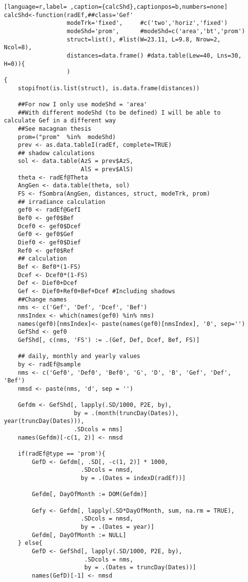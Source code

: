 \begin{lstlisting}[language=r,label= ,caption={calcShd},captionpos=b,numbers=none]
calcShd<-function(radEf,##class='Gef'
                  modeTrk='fixed',     #c('two','horiz','fixed')
                  modeShd='prom',      #modeShd=c('area','bt','prom')
                  struct=list(), #list(W=23.11, L=9.8, Nrow=2, Ncol=8), 
                  distances=data.frame() #data.table(Lew=40, Lns=30, H=0)){
                  )
{
    stopifnot(is.list(struct), is.data.frame(distances))

    ##For now I only use modeShd = 'area'
    ##With different modeShd (to be defined) I will be able to calculate Gef in a different way
    ##See macagnan thesis
    prom=("prom"  %in%  modeShd)
    prev <- as.data.tableI(radEf, complete=TRUE)
    ## shadow calculations
    sol <- data.table(AzS = prev$AzS,
                      AlS = prev$AlS)
    theta <- radEf@Theta
    AngGen <- data.table(theta, sol)
    FS <- fSombra(AngGen, distances, struct, modeTrk, prom)
    ## irradiance calculation
    gef0 <- radEf@GefI
    Bef0 <- gef0$Bef
    Dcef0 <- gef0$Dcef
    Gef0 <- gef0$Gef
    Dief0 <- gef0$Dief
    Ref0 <- gef0$Ref
    ## calculation
    Bef <- Bef0*(1-FS)
    Dcef <- Dcef0*(1-FS)
    Def <- Dief0+Dcef
    Gef <- Dief0+Ref0+Bef+Dcef #Including shadows
    ##Change names
    nms <- c('Gef', 'Def', 'Dcef', 'Bef')
    nmsIndex <- which(names(gef0) %in% nms)
    names(gef0)[nmsIndex]<- paste(names(gef0)[nmsIndex], '0', sep='')
    GefShd <- gef0
    GefShd[, c(nms, 'FS') := .(Gef, Def, Dcef, Bef, FS)]

    ## daily, monthly and yearly values
    by <- radEf@sample
    nms <- c('Gef0', 'Def0', 'Bef0', 'G', 'D', 'B', 'Gef', 'Def', 'Bef')
    nmsd <- paste(nms, 'd', sep = '')

    Gefdm <- GefShd[, lapply(.SD/1000, P2E, by),
                    by = .(month(truncDay(Dates)), year(truncDay(Dates))),
                    .SDcols = nms]
    names(Gefdm)[-c(1, 2)] <- nmsd

    if(radEf@type == 'prom'){
        GefD <- Gefdm[, .SD[, -c(1, 2)] * 1000,
                      .SDcols = nmsd,
                      by = .(Dates = indexD(radEf))] 

        Gefdm[, DayOfMonth := DOM(Gefdm)]

        Gefy <- Gefdm[, lapply(.SD*DayOfMonth, sum, na.rm = TRUE),
                      .SDcols = nmsd,
                      by = .(Dates = year)]
        Gefdm[, DayOfMonth := NULL]
    } else{    
        GefD <- GefShd[, lapply(.SD/1000, P2E, by),
                       .SDcols = nms,
                       by = .(Dates = truncDay(Dates))]
        names(GefD)[-1] <- nmsd


\end{lstlisting}
